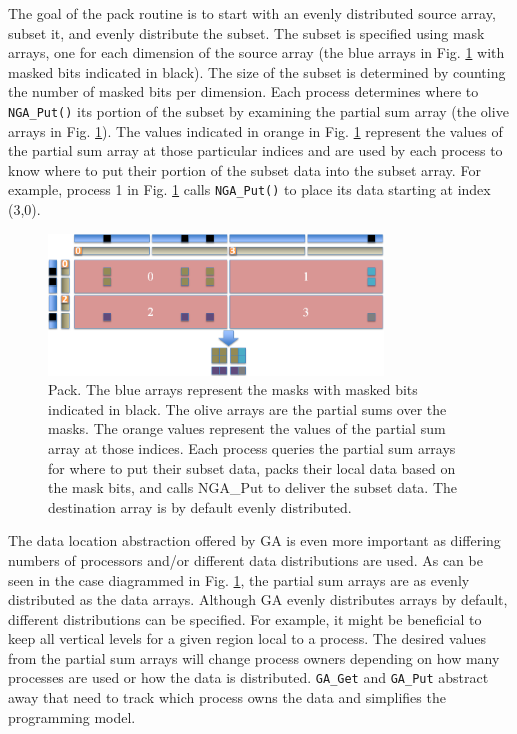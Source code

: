 The goal of the pack routine is to start with an evenly distributed source
array, subset it, and evenly distribute the subset.  The subset is specified
using mask arrays, one for each dimension of the source array (the blue arrays
in Fig. \ref{fig:pack} with masked bits indicated in black).  The size of the
subset is determined by counting the number of masked bits per dimension.
Each process determines where to \verb=NGA_Put()= its portion of the subset by
examining the partial sum array (the olive arrays in Fig. \ref{fig:pack}).
The values indicated in orange in Fig. \ref{fig:pack} represent the values of
the partial sum array at those particular indices and are used by each process
to know where to put their portion of the subset data into the subset array.
For example, process 1 in Fig. \ref{fig:pack} calls \verb=NGA_Put()= to place
its data starting at index (3,0).

\begin{figure}[!t]
\center
\includegraphics[width=3.5in]{images/pack}
\caption{Pack.  The blue arrays represent the masks with masked bits indicated
in black.  The olive arrays are the partial sums over the masks.  The orange
values represent the values of the partial sum array at those indices.  Each
process queries the partial sum arrays for where to put their subset data,
packs their local data based on the mask bits, and calls NGA\_Put to deliver
the subset data.  The destination array is by default evenly distributed.}
\label{fig:pack}
\end{figure}

The data location abstraction offered by GA is even more important as
differing numbers of processors and/or different data distributions are used.
As can be seen in the case diagrammed in Fig. \ref{fig:pack}, the partial sum
arrays are as evenly distributed as the data arrays.  Although GA evenly
distributes arrays by default, different distributions can be specified.  For
example, it might be beneficial to keep all vertical levels for a given region
local to a process.  The desired values from the partial sum arrays will
change process owners depending on how many processes are used or how the data
is distributed.  \verb+GA_Get+ and \verb+GA_Put+ abstract away that need to
track which process owns the data and simplifies the programming model.
